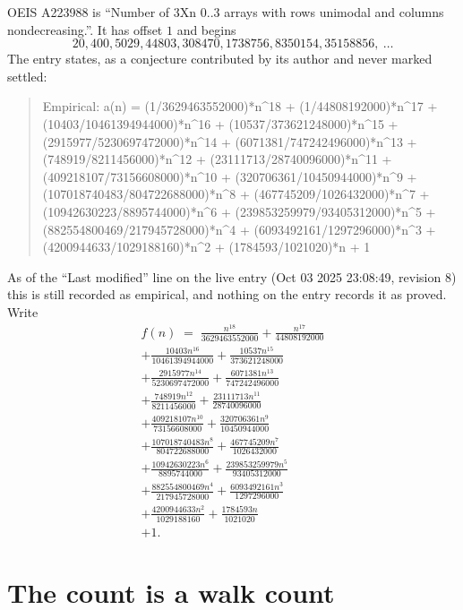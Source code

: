 \documentclass[11pt,a4paper]{article}
\theoremstyle{plain}
\theoremstyle{definition}
\begin{document}
OEIS A223988 is ``Number of 3Xn 0..3 arrays with rows unimodal and columns nondecreasing.''. It has offset $1$ and begins
\[
20, 400, 5029, 44803, 308470, 1738756, 8350154, 35158856,\ \dots
\]
The entry states, as a conjecture contributed by its author and never marked settled:
\begin{quote}\raggedright\small
Empirical: a(n) = (1/3629463552000)*n\^{}18 + (1/44808192000)*n\^{}17 + (10403/10461394944000)*n\^{}16 + (10537/373621248000)*n\^{}15 + (2915977/5230697472000)*n\^{}14 + (6071381/747242496000)*n\^{}13 + (748919/8211456000)*n\^{}12 + (23111713/28740096000)*n\^{}11 + (409218107/73156608000)*n\^{}10 + (320706361/10450944000)*n\^{}9 + (107018740483/804722688000)*n\^{}8 + (467745209/1026432000)*n\^{}7 + (10942630223/8895744000)*n\^{}6 + (239853259979/93405312000)*n\^{}5 + (882554800469/217945728000)*n\^{}4 + (6093492161/1297296000)*n\^{}3 + (4200944633/1029188160)*n\^{}2 + (1784593/1021020)*n + 1
\end{quote}
As of the ``Last modified'' line on the live entry (Oct 03 2025 23:08:49, revision 8) this is still
recorded as empirical, and nothing on the entry records it as proved. Write
\begin{multline*}
f(n)\;=\;\frac{n^{18}}{3629463552000} + \frac{n^{17}}{44808192000} \\
+ \frac{10403 n^{16}}{10461394944000} + \frac{10537 n^{15}}{373621248000} \\
+ \frac{2915977 n^{14}}{5230697472000} + \frac{6071381 n^{13}}{747242496000} \\
+ \frac{748919 n^{12}}{8211456000} + \frac{23111713 n^{11}}{28740096000} \\
+ \frac{409218107 n^{10}}{73156608000} + \frac{320706361 n^{9}}{10450944000} \\
+ \frac{107018740483 n^{8}}{804722688000} + \frac{467745209 n^{7}}{1026432000} \\
+ \frac{10942630223 n^{6}}{8895744000} + \frac{239853259979 n^{5}}{93405312000} \\
+ \frac{882554800469 n^{4}}{217945728000} + \frac{6093492161 n^{3}}{1297296000} \\
+ \frac{4200944633 n^{2}}{1029188160} + \frac{1784593 n}{1021020} \\
+ 1.
\end{multline*}

\section{The count is a walk count}
\end{document}
